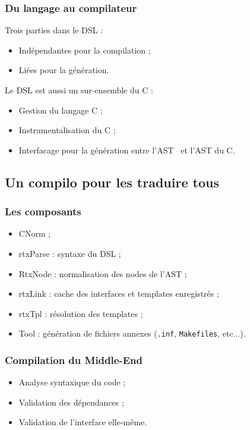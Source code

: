 \documentclass[]{beamer}
\begin{document}
\begin{frame}
\frametitle{Du langage au compilateur}
 {
    Trois parties dans le DSL :
    \begin{itemize}
        \item Indépendantes pour la compilation ;
        \item Liées pour la génération.
    \end{itemize}
}
 {
    Le DSL est aussi un sur-ensemble du C :
    \begin{itemize}
        \item Gestion du langage C ;
        \item Instrumentalisation du C ;
        \item Interfacage pour la génération entre
            l'AST \rtx\ et l'AST du C.
    \end{itemize}
}
\end{frame}


\subsection{Un compilo pour les traduire tous}
\begin{frame}
\frametitle{Les composants}
\begin{itemize}[<+->]
    \item CNorm ;
    \item rtxParse : syntaxe du DSL ;
    \item RtxNode : normalisation des nodes de l'AST ;
    \item rtxLink : cache des interfaces et templates enregistrés ;
    \item rtxTpl : résolution des templates ;
    \item Tool : génération de fichiers annexes (\texttt{.inf},
                 \texttt{Makefiles}, etc...).
\end{itemize}
\end{frame}


\begin{frame}
\frametitle{Compilation du Middle-End}
\begin{itemize}[<+->]
    \item Analyse syntaxique du code ;
    \item Validation des dépendances ;
    \item Validation de l'interface elle-même.
\end{itemize}
\end{frame}
\end{document}
